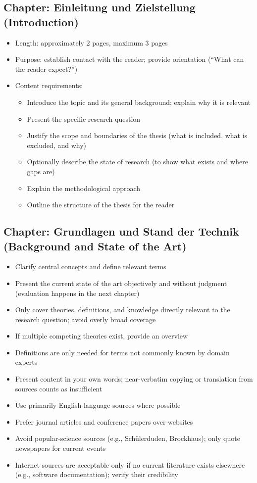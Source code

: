 \subsection{Chapter: Einleitung und Zielstellung (Introduction)}
\begin{itemize}
    \item Length: approximately 2 pages, maximum 3 pages
    \item Purpose: establish contact with the reader; provide orientation (``What can the reader expect?'')
    \item Content requirements:
    \begin{itemize}
        \item Introduce the topic and its general background; explain why it is relevant
        \item Present the specific research question
        \item Justify the scope and boundaries of the thesis (what is included, what is excluded, and why)
        \item Optionally describe the state of research (to show what exists and where gaps are)
        \item Explain the methodological approach
        \item Outline the structure of the thesis for the reader
    \end{itemize}
\end{itemize}

\subsection{Chapter: Grundlagen und Stand der Technik (Background and State of the Art)}
\begin{itemize}
    \item Clarify central concepts and define relevant terms
    \item Present the current state of the art objectively and without judgment (evaluation happens in the next chapter)
    \item Only cover theories, definitions, and knowledge directly relevant to the research question; avoid overly broad coverage
    \item If multiple competing theories exist, provide an overview
    \item Definitions are only needed for terms not commonly known by domain experts
    \item Present content in your own words; near-verbatim copying or translation from sources counts as insufficient
    \item Use primarily English-language sources where possible
    \item Prefer journal articles and conference papers over websites
    \item Avoid popular-science sources (e.g., Schülerduden, Brockhaus); only quote newspapers for current events
    \item Internet sources are acceptable only if no current literature exists elsewhere (e.g., software documentation); verify their credibility
\end{itemize}


